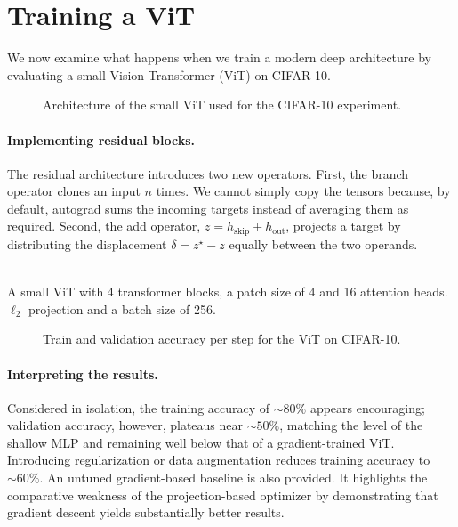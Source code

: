 \section{Training a ViT}
\label{sec:exp-modern-arch}
We now examine what happens when we train a modern deep architecture by evaluating a small Vision Transformer (ViT) on CIFAR-10.
\begin{figure}[ht]
\centering
\resizebox{\textwidth}{!}{}
\caption{Architecture of the small ViT used for the CIFAR-10 experiment.}
\label{fig:vit-architecture}
\end{figure}

\paragraph{Implementing residual blocks.} The residual architecture introduces two new operators. First, the branch operator clones an input $n$ times. We cannot simply copy the tensors because, by default, autograd sums the incoming targets instead of averaging them as required. Second, the add operator, $z = h_{\mathrm{skip}} + h_{\mathrm{out}}$, projects a target by distributing the displacement $\delta = z^{\star}-z$ equally between the two operands.
\begin{tcolorbox}[reprocard, title=Setup]
\\
A small ViT with 4 transformer blocks, a patch size of $4$ and 16 attention heads. $\ell_2$ projection and a batch size of 256.
\end{tcolorbox}

\begin{figure}[ht]
    \centering
    \caption{Train and validation accuracy per step for the ViT on
CIFAR-10.}
    \label{fig:vit-accuracy}
    \end{figure}
\paragraph{Interpreting the results.} Considered in isolation, the training
accuracy of $\sim\!80\%$ appears encouraging; validation accuracy, however, plateaus near $\sim\!50\%$, matching the level of the shallow MLP and remaining
well below that of a gradient-trained ViT. Introducing regularization or data
augmentation reduces training accuracy to $\sim\!60\%$. An untuned gradient-based baseline is also provided. It highlights the comparative weakness of the projection-based optimizer by demonstrating that gradient descent yields substantially better results.
 
